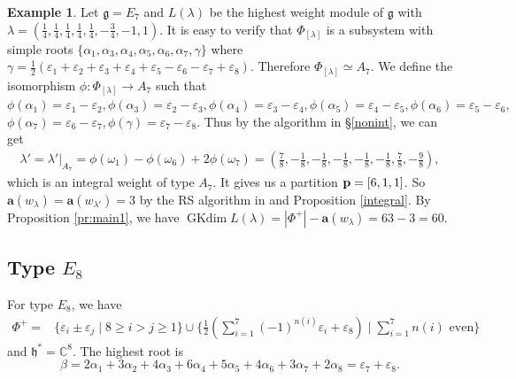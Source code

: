 \documentclass[reqno,12pt]{amsart}
\numberwithin{equation}{section}
\theoremstyle{plain}
\theoremstyle{definition}
\newtheorem{ex}[Thm]{Example}
\newcommand{\lam}{\lambda}
\newcommand{\ep}{\varepsilon}
\newcommand{\Ann}{\mathrm{Ann}}
\newcommand{\hs}{ \mathfrak{h}^*}
\newcommand{\aff}{ \mathbf{a} }
\newcommand{\gkd}{\operatorname{GKdim}}
\renewcommand{\geq}{\geqslant}
\begin{document}
\begin{ex}
	Let $\mathfrak{g}=E_7$ and $L(\lam)$ be the highest weight module of $\mathfrak{g}$ with  $\lambda=(\frac{1}{4},\frac{1}{4},\frac{1}{4},\frac{1}{4},\frac{1}{4},-\frac{3}{4},-1,1)$. It is easy to verify that $\Phi_{[\lambda]}$ is a subsystem with simple roots $\{ \alpha_1,\alpha_3,\alpha_4,\alpha_5,\alpha_6,\alpha_7,\gamma\}$ where $\gamma=\frac{1}{2}(\ep_1+\ep_2+\ep_3+\ep_4+\ep_5-\ep_6-\ep_7+\ep_8)$. Therefore $\Phi_{[\lambda]}\simeq A_7$.  We define the  isomorphism $\phi:  \Phi_{[\lambda]} \rightarrow A_7$ such that  $\phi(\alpha_1)=\ep_1-\ep_2, \phi(\alpha_3)=\ep_2-\ep_3, \phi(\alpha_4)=\ep_3-\ep_4, \phi(\alpha_5)=\ep_4-\ep_5,\phi(\alpha_6)=\ep_5-\ep_6,$  $\phi(\alpha_7)=\ep_6-\ep_7,\phi(\gamma)=\ep_7-\ep_8$.
Thus by the algorithm in \S \ref{nonint}, we can get
\begin{align*}
            {\lam}'={\lam}'|_{A_7}=\phi(\omega_1)-\phi(\omega_6)+2\phi(\omega_7)
           =\left(\frac{7}{8},-\frac{1}{8},-\frac{1}{8},-\frac{1}{8},-\frac{1}{8},-\frac{1}{8},\frac{7}{8},-\frac{9}{8}\right),
        \end{align*} 
      which  is an integral weight of type $A_7$.
 It gives us a partition ${\bf p}=[6,1,1]$. So $\aff(w_{\lambda})=\aff(w_{\lambda'})=3$ by the RS algorithm in \cite{BXX} and Proposition \ref{integral}. 
 By Proposition \ref{pr:main1},  we have $\gkd L(\lambda)=|\Phi^+|-\aff(w_{\lambda})=63-3=60$.
\end{ex}

\subsection{Type \texorpdfstring{$E_8$}{}}
For type $E_8$, we have \begin{align*}
  \Phi^+=&
\{\ep_i \pm \ep_j \mid 8\geq i > j\geq 1\} \cup
\Big\{\frac{1}{2}(\sum_{i=1}^7 (-1)^{n(i)}\ep_i+\ep_8)\mid \sum_{i=1}^7n(i) \text{ even}\Big\}
\end{align*}
and $ \hs=\mathbb{C}^8$. The highest root is $$\beta=2\alpha_1+3\alpha_2+4\alpha_3+6\alpha_4+5\alpha_5+4\alpha_6+3\alpha_7+2\alpha_8=\ep_7+\ep_8.$$
\end{document}
